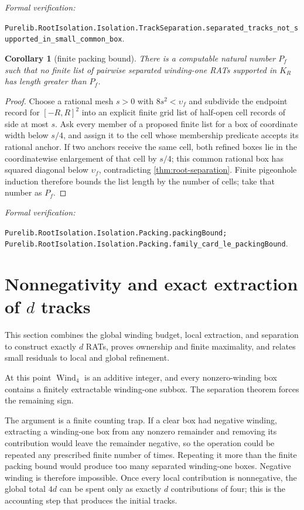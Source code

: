 \documentclass[11pt]{article}
\newtheorem{corollary}[theorem]{Corollary}
\newcommand{\Wind}{\operatorname{Wind}}
\newcommand{\leanref}[1]{\par\smallskip\noindent
  \emph{Formal verification:}\par\nobreak
  {\raggedright\nolinkurl{#1}.\par}}
\begin{document}
\leanref{Purelib.RootIsolation.Isolation.TrackSeparation.separated_tracks_not_supported_in_small_common_box}

\begin{corollary}[finite packing bound]
\label{cor:packing}
There is a computable natural number $P_f$ such that no finite list of pairwise separated winding-one RATs supported in $K_R$ has length greater than $P_f$.
\end{corollary}

\begin{proof}
Choose a rational mesh $s>0$ with $8s^2<\upsilon_f$ and subdivide the
endpoint record for $[-R,R]^2$ into an explicit finite grid list of half-open
cell records of side at most $s$.  Ask every member of a proposed finite list
for a box of coordinate width below $s/4$, and assign it to the cell whose
membership predicate accepts its rational anchor.  If two anchors receive
the same cell, both refined boxes lie in the coordinatewise enlargement of
that cell by $s/4$; this common rational box has squared diagonal below
$\upsilon_f$, contradicting \cref{thm:root-separation}.  Finite pigeonhole
induction therefore bounds the list length by the number of cells; take that
number as $P_f$.
\end{proof}

\leanref{Purelib.RootIsolation.Isolation.Packing.packingBound;
Purelib.RootIsolation.Isolation.Packing.family_card_le_packingBound}

\section{Nonnegativity and exact extraction of \texorpdfstring{$d$}{d} tracks}
\label{sec:exact-isolation}

This section combines the global winding budget, local extraction, and
separation to construct exactly $d$ RATs, proves ownership and finite
maximality, and relates small residuals to local and global refinement.

At this point $\Wind_4$ is an additive integer, and every nonzero-winding box
contains a finitely extractable winding-one subbox.  The separation
theorem forces the remaining sign.

The argument is a finite counting trap.  If a clear box had negative
winding, extracting a winding-one box from any nonzero remainder and removing its
contribution would leave the remainder negative, so the operation could be
repeated any prescribed finite number of times.  Repeating it more than the
finite packing bound would produce too many separated winding-one boxes.
Negative winding is therefore impossible.  Once every local contribution is
nonnegative, the global total $4d$ can be spent only as exactly $d$
contributions of four; this is the accounting step that produces the initial
tracks.
\end{document}
